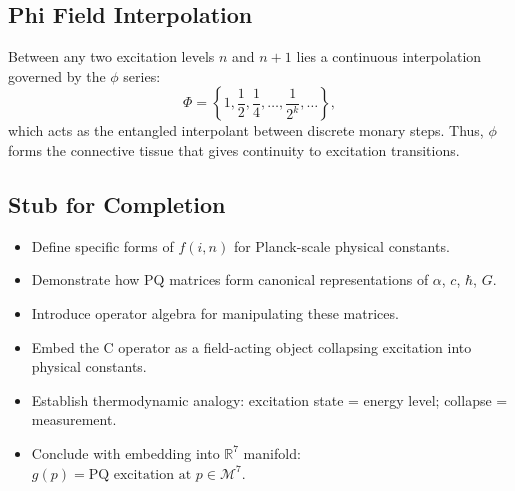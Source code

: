 \documentclass{article}
\begin{document}
\subsection{Phi Field Interpolation}

Between any two excitation levels $n$ and $n+1$ lies a continuous interpolation governed by the $\phi$ series:
\begin{equation}
    \Phi = \left\{1, \frac{1}{2}, \frac{1}{4}, \ldots, \frac{1}{2^k}, \ldots \right\},
\end{equation}
which acts as the entangled interpolant between discrete monary steps. Thus, $\phi$ forms the connective tissue that gives continuity to excitation transitions.

\subsection{Stub for Completion}
\begin{itemize}
    \item Define specific forms of $f(i,n)$ for Planck-scale physical constants.
    \item Demonstrate how PQ matrices form canonical representations of $\alpha$, $c$, $\hbar$, $G$.
    \item Introduce operator algebra for manipulating these matrices.
    \item Embed the C operator as a field-acting object collapsing excitation into physical constants.
    \item Establish thermodynamic analogy: excitation state = energy level; collapse = measurement.
    \item Conclude with embedding into $\mathbb{R}^7$ manifold: $g(p) = \text{PQ excitation at } p \in \mathcal{M}^7$.
\end{itemize}
\end{document}
